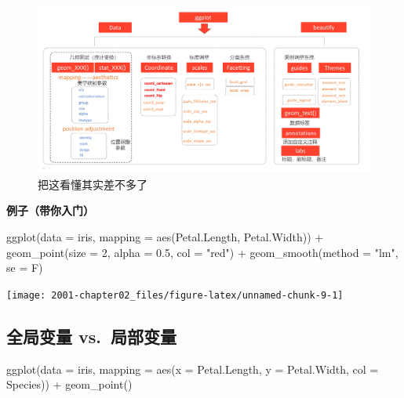 \documentclass[
]{book}
\newenvironment{Shaded}{\begin{snugshade}}{\end{snugshade}}
\newcommand{\AttributeTok}[1]{\textcolor[rgb]{0.77,0.63,0.00}{#1}}
\newcommand{\DecValTok}[1]{\textcolor[rgb]{0.00,0.00,0.81}{#1}}
\newcommand{\FloatTok}[1]{\textcolor[rgb]{0.00,0.00,0.81}{#1}}
\newcommand{\FunctionTok}[1]{\textcolor[rgb]{0.00,0.00,0.00}{#1}}
\newcommand{\NormalTok}[1]{#1}
\newcommand{\SpecialCharTok}[1]{\textcolor[rgb]{0.00,0.00,0.00}{#1}}
\newcommand{\StringTok}[1]{\textcolor[rgb]{0.31,0.60,0.02}{#1}}
\begin{document}
\begin{figure}
\centering
\includegraphics{figure/22.png}
\caption{把这看懂其实差不多了}
\end{figure}

\textbf{例子（带你入门）}

\begin{Shaded}
\begin{Highlighting}[]
\FunctionTok{ggplot}\NormalTok{(}\AttributeTok{data =}\NormalTok{ iris, }\AttributeTok{mapping =} \FunctionTok{aes}\NormalTok{(Petal.Length, Petal.Width)) }\SpecialCharTok{+} \FunctionTok{geom\_point}\NormalTok{(}\AttributeTok{size =} \DecValTok{2}\NormalTok{, }
    \AttributeTok{alpha =} \FloatTok{0.5}\NormalTok{, }\AttributeTok{col =} \StringTok{"red"}\NormalTok{) }\SpecialCharTok{+} \FunctionTok{geom\_smooth}\NormalTok{(}\AttributeTok{method =} \StringTok{"lm"}\NormalTok{, }\AttributeTok{se =}\NormalTok{ F)}
\end{Highlighting}
\end{Shaded}

\begin{center}\texttt{[image: 2001-chapter02\_files/figure-latex/unnamed-chunk-9-1]} \end{center}

\hypertarget{ux5168ux5c40ux53d8ux91cf-vs.-ux5c40ux90e8ux53d8ux91cf}{%
\subsection{全局变量 vs.~局部变量}\label{ux5168ux5c40ux53d8ux91cf-vs.-ux5c40ux90e8ux53d8ux91cf}}

\begin{Shaded}
\begin{Highlighting}[]
\FunctionTok{ggplot}\NormalTok{(}\AttributeTok{data =}\NormalTok{ iris, }\AttributeTok{mapping =} \FunctionTok{aes}\NormalTok{(}\AttributeTok{x =}\NormalTok{ Petal.Length, }\AttributeTok{y =}\NormalTok{ Petal.Width, }\AttributeTok{col =}\NormalTok{ Species)) }\SpecialCharTok{+} 
    \FunctionTok{geom\_point}\NormalTok{()}
\end{Highlighting}
\end{Shaded}
\end{document}
